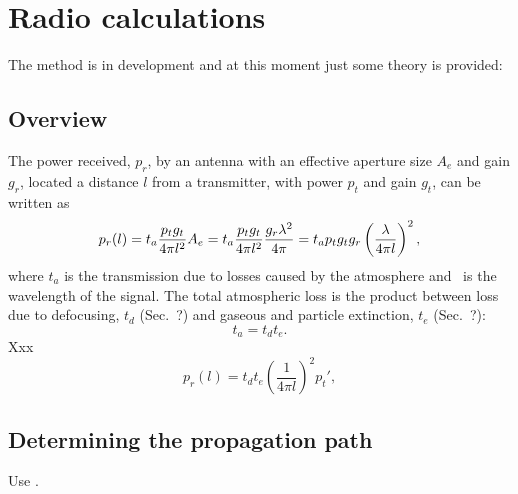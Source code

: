 \section{Radio calculations}
\label{sec:radiolinks}

The  method is in development and at this moment just
some theory is provided:


\subsection{Overview}
\label{sec:radiolinks:oview}

The power received, $p_r$, by an antenna with an effective aperture size
$A_e$ and gain $g_r$, located a distance $l$ from a transmitter, with power
$p_t$ and gain $g_t$, can be written as
\begin{equation}
  p_r(l) = t_a\frac{p_tg_t}{4\pi l^2}A_e=t_a\frac{p_tg_t}{4\pi l^{2}}
  \frac{g_r\lambda^2}{4\pi}=t_ap_tg_tg_r\left(\frac{\lambda}{4\pi l} \right)^2,
\end{equation}
where $t_a$ is the transmission due to losses caused by the atmosphere and
\Wvl\ is the wavelength of the signal. The total atmospheric loss is the
product between loss due to defocusing, $t_d$ (Sec.~?) and gaseous and particle
extinction, $t_e$ (Sec.~?):
\begin{equation}
  t_a = t_d t_e.
\end{equation}
Xxx
\begin{equation}
  p_r(l) = t_d t_e \left(\frac{1}{4\pi l} \right)^2 p_t',
\end{equation}




\subsection{Determining the propagation path}
\label{sec:radiolinks:ppath}

Use .


